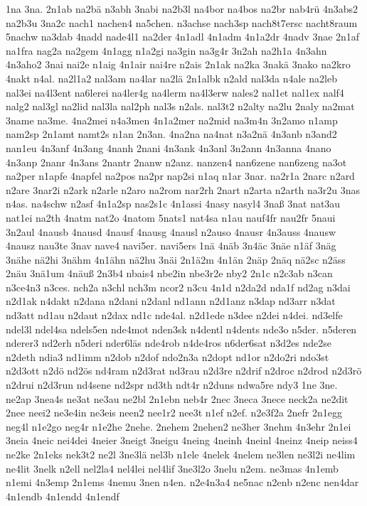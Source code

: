 {1na
3na.
2n1ab
na2bä
n3abh
3nabi
na2b3l
na4bor
na4bos
na2br
nab4rü
4n3abs2
na2b3u
3na2c
nach1
nachen4
na5chen.
n3achse
nach3sp
nach8t7ersc
nacht8raum
5nachw
na3dab
4nadd
nade4l1
na2der
4n1adl
4n1adm
4n1a2dr
4nadv
3nae
2n1af
na1fra
nag2a
na2gem
4n1agg
n1a2gi
na3gin
na3g4r
3n2ah
na2h1a
4n3ahn
4n3aho2
3nai
nai2e
n1aig
4n1air
nai4re
n2ais
2n1ak
na2ka
3nakä
3nako
na2kro
4nakt
n4al.
na2l1a2
nal3am
na4lar
na2lä
2n1albk
n2ald
nal3da
n4ale
na2leb
nal3ei
na4l3ent
na6lerei
na4ler4g
na4lerm
na4l3erw
nales2
nal1et
nal1ex
nalf4
nalg2
nal3gl
na2lid
nal3la
nal2ph
nal3s
n2als.
nal3t2
n2alty
na2lu
2naly
na2mat
3name
na3me.
4na2mei
n4a3men
4n1a2mer
na2mid
na3m4n
3n2amo
n1amp
nam2sp
2n1amt
namt2s
n1an
2n3an.
4na2na
na4nat
n3a2nä
4n3anb
n3and2
nan1eu
4n3anf
4n3ang
4nanh
2nani
4n3ank
4n3anl
3n2ann
4n3anna
4nano
4n3anp
2nanr
4n3ans
2nantr
2nanw
n2anz.
nanzen4
nan6zene
nan6zeng
na3ot
na2per
n1apfe
4napfel
na2pos
na2pr
nap2si
n1aq
n1ar
3nar.
na2r1a
2narc
n2ard
n2are
3nar2i
n2ark
n2arle
n2aro
na2rom
nar2rh
2nart
n2arta
n2arth
na3r2u
3nas
n4as.
na4schw
n2asf
4n1a2sp
nas2s1c
4n1assi
4nasy
nasyl4
3naß
3nat
nat3au
nat1ei
na2th
4natm
nat2o
4natom
5nats1
nat4sa
n1au
nauf4fr
nau2fr
5naui
3n2aul
4nausb
4nausd
4nausf
4nausg
4nausl
n2auso
4nausr
4n3auss
4nausw
4nausz
nau3te
3nav
nave4
navi5er.
navi5ers
1nä
4näb
3n4äc
3näe
n1äf
3näg
3nähe
nä2hi
3nähm
4n1ähn
nä2hu
3näi
2n1ä2m
4n1än
2näp
2näq
nä2sc
n2äss
2näu
3nä1um
4näuß
2n3b4
nbais4
nbe2in
nbe3r2e
nby2
2n1c
n2c3ab
n3can
n3ce4n3
n3ces.
nch2a
n3chl
nch3m
ncor2
n3cu
4n1d
n2da2d
nda1f
nd2ag
n3dai
n2d1ak
n4dakt
n2dana
n2dani
n2danl
nd1ann
n2d1anz
n3dap
nd3arr
n3dat
nd3att
nd1au
n2daut
n2dax
nd1c
nde4al.
n2d1ede
n3dee
n2dei
n4dei.
nd3elfe
ndel3l
ndel4sa
ndels5en
nde4mot
nden3sk
n4dentl
n4dents
nde3o
n5der.
n5deren
nderer3
nd2erh
n5deri
nder6läs
nde4rob
n4de4ros
n6der6sat
n3d2es
nde2se
n2deth
ndia3
nd1imm
n2dob
n2dof
ndo2n3a
n2dopt
nd1or
n2do2ri
ndo3st
n2d3ott
n2dö
nd2ös
nd4ram
n2d3rat
nd3rau
n2d3re
n2drif
n2droc
n2drod
n2d3rö
n2drui
n2d3run
nd4sene
nd2spr
nd3th
ndt4r
n2duns
ndwa5re
ndy3
1ne
3ne.
ne2ap
3nea4s
ne3at
ne3au
ne2bl
2n1ebn
neb4r
2nec
3neca
3nece
neck2a
ne2dit
2nee
neei2
ne3e4in
ne3eis
neen2
nee1r2
nee3t
n1ef
n2ef.
n2e3f2a
2nefr
2n1egg
neg4l
n1e2go
neg4r
n1e2he
2nehe.
2nehem
2nehen2
ne3her
3nehm
4n3ehr
2n1ei
3neia
4neic
nei4dei
4neier
3neigt
3neigu
4neing
4neinh
4neinl
4neinz
4neip
neiss4
ne2ke
2n1eks
nek3t2
ne2l
3ne3lä
nel3b
n1ele
4nelek
4nelem
ne3len
ne3l2i
ne4lim
ne4lit
3nelk
n2ell
nel2la4
nel4lei
nel4lif
3ne3l2o
3nelu
n2em.
ne3mas
4n1emb
n1emi
4n3emp
2n1ems
4nemu
3nen
n4en.
n2e4n3a4
ne5nac
n2enb
n2enc
nen4dar
4n1endb
4n1endd
4n1endf
}
